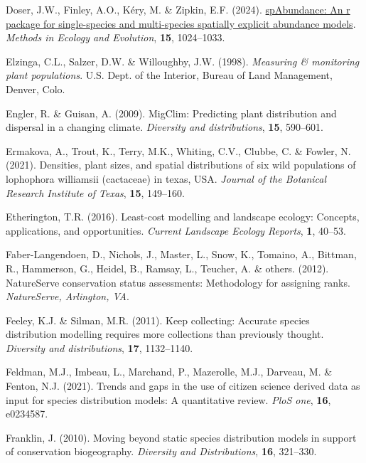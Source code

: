 \documentclass[
]{article}
\newlength{\cslhangindent}
\newenvironment{CSLReferences}[2] %
 {\begin{list}{}{%
  \setlength{\itemindent}{0pt}
  \setlength{\leftmargin}{0pt}
  \setlength{\parsep}{0pt}
  \ifodd #1
   \setlength{\leftmargin}{\cslhangindent}
   \setlength{\itemindent}{-1\cslhangindent}
  \fi
  \setlength{\itemsep}{#2\baselineskip}}}
 {\end{list}}
\begin{document}
\begin{CSLReferences}{1}{1}
Doser, J.W., Finley, A.O., Kéry, M. \& Zipkin, E.F. (2024).
\href{https://doi.org/10.1111/2041-210X.14332}{spAbundance: An r package
for single-species and multi-species spatially explicit abundance
models}. \emph{Methods in Ecology and Evolution}, \textbf{15},
1024--1033.

Elzinga, C.L., Salzer, D.W. \& Willoughby, J.W. (1998). \emph{Measuring
\& monitoring plant populations}. U.S. Dept. of the Interior, Bureau of
Land Management, Denver, Colo.

Engler, R. \& Guisan, A. (2009). MigClim: Predicting plant distribution
and dispersal in a changing climate. \emph{Diversity and distributions},
\textbf{15}, 590--601.

Ermakova, A., Trout, K., Terry, M.K., Whiting, C.V., Clubbe, C. \&
Fowler, N. (2021). Densities, plant sizes, and spatial distributions of
six wild populations of lophophora williamsii (cactaceae) in texas, USA.
\emph{Journal of the Botanical Research Institute of Texas},
\textbf{15}, 149--160.

Etherington, T.R. (2016). Least-cost modelling and landscape ecology:
Concepts, applications, and opportunities. \emph{Current Landscape
Ecology Reports}, \textbf{1}, 40--53.

Faber-Langendoen, D., Nichols, J., Master, L., Snow, K., Tomaino, A.,
Bittman, R., Hammerson, G., Heidel, B., Ramsay, L., Teucher, A. \&
others. (2012). NatureServe conservation status assessments: Methodology
for assigning ranks. \emph{NatureServe, Arlington, VA}.

Feeley, K.J. \& Silman, M.R. (2011). Keep collecting: Accurate species
distribution modelling requires more collections than previously
thought. \emph{Diversity and distributions}, \textbf{17}, 1132--1140.

Feldman, M.J., Imbeau, L., Marchand, P., Mazerolle, M.J., Darveau, M. \&
Fenton, N.J. (2021). Trends and gaps in the use of citizen science
derived data as input for species distribution models: A quantitative
review. \emph{PloS one}, \textbf{16}, e0234587.

Franklin, J. (2010). Moving beyond static species distribution models in
support of conservation biogeography. \emph{Diversity and
Distributions}, \textbf{16}, 321--330.


\end{CSLReferences}
\end{document}
